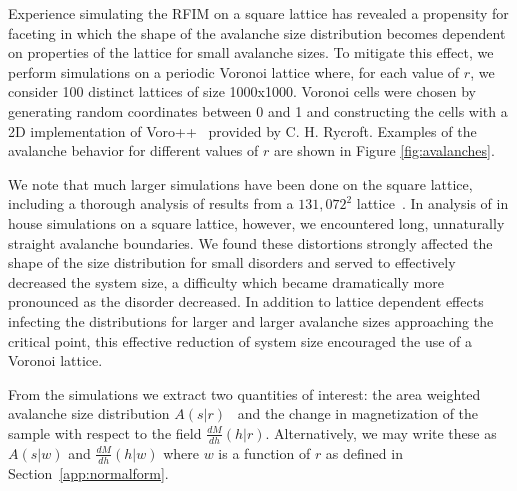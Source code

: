 \documentclass[reprint,amsmath,amssymb,aps,floatfix]{revtex4-1}
\begin{document}
%
Experience simulating the RFIM on a square lattice has revealed a propensity for faceting in which the shape of the avalanche size distribution becomes dependent on properties of the lattice for small avalanche sizes.  To mitigate this effect, we perform simulations on a periodic Voronoi lattice where, for each value of $r$, we consider 100 distinct lattices of size 1000x1000.  Voronoi cells were chosen by generating random coordinates between 0 and 1 and constructing the cells with a 2D implementation of Voro++~\cite{Rycroft09} provided by C. H. Rycroft.  Examples of the avalanche behavior for different values of $r$ are shown in Figure \ref{fig:avalanches}. \par
%
We note that much larger simulations have been done on the square lattice, including a thorough analysis of results from a  $131,072^2$ lattice~\cite{Spasojevic11,Spasojevic11-2}. In analysis of in house simulations on a square lattice, however, we encountered long, unnaturally straight avalanche boundaries. We found these distortions strongly affected the shape of the size distribution for small disorders and served to effectively decreased the system size, a difficulty which became dramatically more pronounced as the disorder decreased. In addition to lattice dependent effects infecting the distributions for larger and larger avalanche sizes approaching the critical point, this effective reduction of system size encouraged the use of a Voronoi lattice. \par
%
From the simulations we extract two quantities of interest: the area weighted avalanche size distribution $A(s|r)$~\cite{Chen11} and the change in magnetization of the sample with respect to the field $\frac{dM}{dh}(h|r)$. Alternatively, we may write these as $A(s|w)$ and $\frac{dM}{dh}(h|w)$ where $w$ is a function of $r$ as defined in Section~\ref{app:normalform}. 
\end{document}
